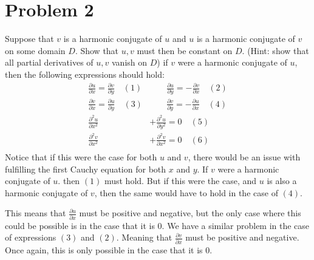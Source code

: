 \documentclass{article}
\newcommand{\parder}[2]{\frac{\partial#1}{\partial#2}}
\newcommand{\secparder}[2]{\frac{\partial^2#1}{\partial#2^2}}
\begin{document}
\newpage
\section*{Problem 2}
Suppose that $v$ is a harmonic conjugate of $u$ and $u$ is a harmonic conjugate of $v$ on some domain $D$. Show that $u,v$ must then be constant on $D$. (Hint: show that all partial derivatives of $u,v$ vanish on $D$)
if $v$ were a harmonic conjugate of $u$, then the following expressions should hold:
\begin{align*}
  \parder{u}{x} = \parder{v}{y} \quad(1)&\quad \quad \parder{u}{y} = -\parder{v}{x} \quad(2)\\
  \parder{v}{x} = \parder{u}{y} \quad(3)&\quad \quad \parder{v}{y} = -\parder{u}{x} \quad(4)\\
  \secparder{u}{x} &+ \secparder{u}{y} = 0\quad (5)\\
  \secparder{v}{x} &+ \secparder{v}{x} = 0 \quad (6)\\
\end{align*}
Notice that if this were the case for both $u$ and $v$, there would be an issue with fulfilling the first Cauchy equation for both $x$ and $y$. If $v$ were a harmonic conjugate of $u$. then  $(1)$ must hold. But if this were the case, and $u$ is also a harmonic conjugate of $v$, then the same would have to hold in the case of $(4)$.

This means that $\parder{u}{x}$ must be positive and negative, but the only case where this could be possible is in the case that it is $0$. We have a similar problem in the case of expressions $(3)$ and  $(2)$. Meaning that $\parder{v}{x}$ must be positive and negative. Once again, this is only possible in the case that it is $0$.
\end{document}
